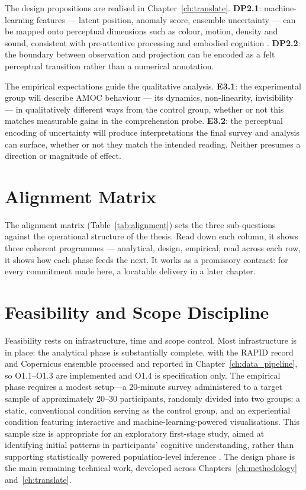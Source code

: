 The design propositions are realised in Chapter~\ref{ch:translate}. \textbf{DP2.1}: machine-learning features --- latent position, anomaly score, ensemble uncertainty --- can be mapped onto perceptual dimensions such as colour, motion, density and sound, consistent with pre-attentive processing and embodied cognition \citep{lakoff1999, ware2021}. \textbf{DP2.2}: the boundary between observation and projection can be encoded as a felt perceptual transition rather than a numerical annotation.

The empirical expectations guide the qualitative analysis. \textbf{E3.1}: the experimental group will describe AMOC behaviour --- its dynamics, non-linearity, invisibility --- in qualitatively different ways from the control group, whether or not this matches measurable gains in the comprehension probe. \textbf{E3.2}: the perceptual encoding of uncertainty will produce interpretations the final survey and analysis can surface, whether or not they match the intended reading. Neither presumes a direction or magnitude of effect.



\section{Alignment Matrix}
\label{sec:alignment-matrix}

The alignment matrix (Table~\ref{tab:alignment}) sets the three sub-questions against the operational structure of the thesis. Read down each column, it shows three coherent programmes --- analytical, design, empirical; read across each row, it shows how each phase feeds the next. It works as a promissory contract: for every commitment made here, a locatable delivery in a later chapter.

\section{Feasibility and Scope Discipline}
\label{sec:rq-feasibility}

Feasibility rests on infrastructure, time and scope control. Most infrastructure is in place: the analytical phase is substantially complete, with the RAPID record and Copernicus ensemble processed and reported in Chapter~\ref{ch:data_pipeline}, so O1.1--O1.3 are implemented and O1.4 is specification only. The empirical phase requires a modest setup---a 20-minute survey administered to a target sample of approximately 20--30 participants, randomly divided into two groups: a static, conventional condition serving as the control group, and an experiential condition featuring interactive and machine-learning-powered visualisations. This sample size is appropriate for an exploratory first-stage study, aimed at identifying initial patterns in participants' cognitive understanding, rather than supporting statistically powered population-level inference \citep{braunclarke2006, smithmcgannon2018}. The design phase is the main remaining technical work, developed across Chapters~\ref{ch:methodology} and~\ref{ch:translate}.


